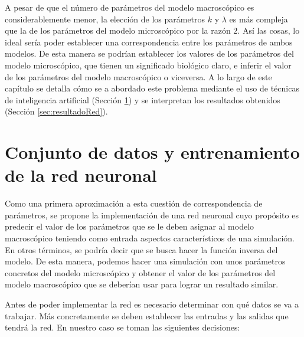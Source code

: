 A pesar de que el número de parámetros del modelo macroscópico es considerablemente menor, la elección de los parámetros $k$ y $\lambda$ es más compleja que la de los parámetros del modelo microscópico por la razón $2$. Así las cosas, lo ideal sería poder establecer una correspondencia entre los parámetros de ambos modelos. De esta manera se podrían establecer los valores de los parámetros del modelo microscópico, que tienen un significado biológico claro, e inferir el valor de los parámetros del modelo macroscópico o viceversa. A lo largo de este capítulo se detalla cómo se a abordado este problema mediante el uso de técnicas de inteligencia artificial (Sección \ref{sec:conjDatos_entreRed}) y se interpretan los resultados obtenidos (Sección \ref{sec:resultadoRed}). 


\section{Conjunto de datos y entrenamiento de la red neuronal}
\label{sec:conjDatos_entreRed}

Como una primera aproximación a esta cuestión de correspondencia de parámetros, se propone la implementación de una red neuronal cuyo propósito es predecir el valor de los parámetros que se le deben asignar al modelo macroscópico teniendo como entrada aspectos característicos de una simulación. En otros términos, se podría decir que se busca hacer la función inversa del modelo. De esta manera, podemos hacer una simulación con unos parámetros concretos del modelo microscópico y obtener el valor de los parámetros del modelo macroscópico que se deberían usar para lograr un resultado similar. 

Antes de poder implementar la red es necesario determinar con qué datos se va a trabajar. Más concretamente se deben establecer las entradas y las salidas que tendrá la red. En nuestro caso se toman las siguientes decisiones:



